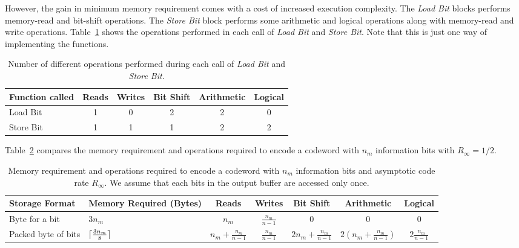 However, the gain in minimum memory requirement comes with a cost of increased execution complexity. The \emph{Load Bit} blocks performs memory-read and bit-shift operations. The \emph{Store Bit} block performs some arithmetic and logical operations along with memory-read and write operations. Table~\ref{tab:load_store} shows the operations performed in each call of \emph{Load Bit} and \emph{Store Bit}. Note that this is just one way of implementing the functions.
\begin{table}[htbp]
  \centering
  \begin{tabular}{|l|c|c|c|c|c|}
    \hline
    \textbf{Function called} &\textbf{Reads} &\textbf{Writes} &\textbf{Bit Shift} &\textbf{Arithmetic} &\textbf{Logical}\\
    \hline
    \hline
    Load Bit &1 &0 &2 &2 &0\\
    \hline
    Store Bit &1 &1 &1 &2 &2\\
    \hline
  \end{tabular}
  \caption[Operations performed for different storage formats.]{Number of different operations performed during each call of \emph{Load Bit} and \emph{Store Bit}.}
  \label{tab:load_store}
\end{table}

Table~\ref{tab:summ_mem_req} compares the memory requirement and operations required to encode a codeword with $n_m$ information bits with $R_\infty=1/2$.
\begin{table}[htbp]
  \centering
  \begin{tabular}{|p{3cm}|>{\centering\arraybackslash}p{3cm}|c|c|c|c|c|}
    \hline
    \textbf{Storage Format} &\textbf{Memory Required (Bytes)} &\textbf{Reads} &\textbf{Writes} &\textbf{Bit Shift} &\textbf{Arithmetic} &\textbf{Logical}\\
    \hline
    \hline
    Byte for a bit &$3n_m$ &$n_m$ &$\frac{n_m}{n-1}$ &0 &0 &0\\
    \hline
    Packed byte of bits &$\lceil\frac{3n_m}{8}\rceil$ &$n_m+\frac{n_m}{n-1}$ &$\frac{n_m}{n-1}$ &$2n_m+\frac{n_m}{n-1}$ &$2\left(n_m+\frac{n_m}{n-1}\right)$ &$2\frac{n_m}{n-1}$\\
    \hline
  \end{tabular}
  \caption[Memory and complexity of different storage formats.]{Memory requirement and operations required to encode a codeword with $n_m$ information bits and asymptotic code rate $R_\infty$. We assume that each bits in the output buffer are accessed only once.}
  \label{tab:summ_mem_req}
\end{table}

